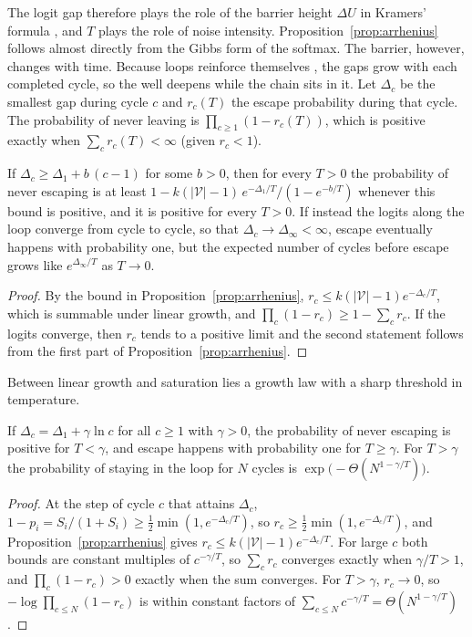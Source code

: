 The logit gap therefore plays the role of the barrier height $\Delta U$ in Kramers' formula \citep{kramers1940brownian}, and $T$ plays the role of noise intensity. Proposition~\ref{prop:arrhenius} follows almost directly from the Gibbs form of the softmax. The barrier, however, changes with time. Because loops reinforce themselves \citep{xu2022learning}, the gaps grow with each completed cycle, so the well deepens while the chain sits in it. Let $\Delta_c$ be the smallest gap during cycle $c$ and $r_c(T)$ the escape probability during that cycle. The probability of never leaving is $\prod_{c\ge1}(1-r_c(T))$, which is positive exactly when $\sum_c r_c(T)<\infty$ (given $r_c<1$).

\begin{proposition}
\label{prop:lock}
If $\Delta_c\ge\Delta_1+b\,(c-1)$ for some $b>0$, then for every $T>0$ the probability of never escaping is at least $1-k(|\mathcal V|-1)\,e^{-\Delta_1/T}/(1-e^{-b/T})$ whenever this bound is positive, and it is positive for every $T>0$. If instead the logits along the loop converge from cycle to cycle, so that $\Delta_c\to\Delta_\infty<\infty$, escape eventually happens with probability one, but the expected number of cycles before escape grows like $e^{\Delta_\infty/T}$ as $T\to0$.
\end{proposition}
\begin{proof}
By the bound in Proposition~\ref{prop:arrhenius}, $r_c\le k(|\mathcal V|-1)e^{-\Delta_c/T}$, which is summable under linear growth, and $\prod_c(1-r_c)\ge1-\sum_c r_c$. If the logits converge, then $r_c$ tends to a positive limit and the second statement follows from the first part of Proposition~\ref{prop:arrhenius}.
\end{proof}

Between linear growth and saturation lies a growth law with a sharp threshold in temperature.

\begin{proposition}
\label{prop:tlock}
If $\Delta_c=\Delta_1+\gamma\ln c$ for all $c\ge1$ with $\gamma>0$, the probability of never escaping is positive for $T<\gamma$, and escape happens with probability one for $T\ge\gamma$. For $T>\gamma$ the probability of staying in the loop for $N$ cycles is $\exp\!\big(-\Theta(N^{1-\gamma/T})\big)$.
\end{proposition}
\begin{proof}
At the step of cycle $c$ that attains $\Delta_c$, $1-p_i=S_i/(1+S_i)\ge\tfrac12\min(1,e^{-\Delta_c/T})$, so $r_c\ge\tfrac12\min(1,e^{-\Delta_c/T})$, and Proposition~\ref{prop:arrhenius} gives $r_c\le k(|\mathcal V|-1)e^{-\Delta_c/T}$. For large $c$ both bounds are constant multiples of $c^{-\gamma/T}$, so $\sum_c r_c$ converges exactly when $\gamma/T>1$, and $\prod_c(1-r_c)>0$ exactly when the sum converges. For $T>\gamma$, $r_c\to0$, so $-\log\prod_{c\le N}(1-r_c)$ is within constant factors of $\sum_{c\le N}c^{-\gamma/T}=\Theta(N^{1-\gamma/T})$.
\end{proof}

